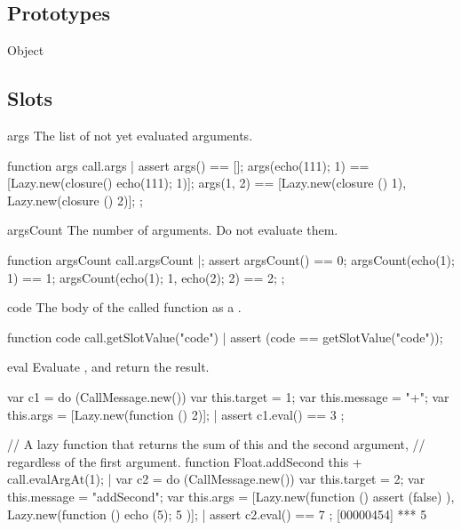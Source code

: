 \subsection{Prototypes}
\begin{refObjects}
\item[Object]
\end{refObjects}

\subsection{Slots}

\begin{urbiscriptapi}
\item[args]%
  The list of not yet evaluated arguments.
\begin{urbiscript}
function args { call.args }|
assert
{
  args() == [];
  args({echo(111); 1}) == [Lazy.new(closure() {echo(111); 1})];
  args(1, 2) == [Lazy.new(closure () {1}),
                 Lazy.new(closure () {2})];
};
\end{urbiscript}


\item[argsCount]
  The number of arguments.  Do not evaluate them.
\begin{urbiscript}
function argsCount { call.argsCount }|;
assert
{
  argsCount() == 0;
  argsCount({echo(1); 1}) == 1;
  argsCount({echo(1); 1}, {echo(2); 2}) == 2;
};
\end{urbiscript}


\item[code]
  The body of the called function as a .
\begin{urbiscript}
function code { call.getSlotValue("code") }|
assert (code == getSlotValue("code"));
\end{urbiscript}


\item[eval] Evaluate \this, and return the result.
\begin{urbiscript}
var c1 = do (CallMessage.new())
{
  var this.target = 1;
  var this.message = "+";
  var this.args = [Lazy.new(function () {2})];
}|
assert { c1.eval() == 3 };

// A lazy function that returns the sum of this and the second argument,
// regardless of the first argument.
function Float.addSecond
{
  this + call.evalArgAt(1);
}|
var c2 = do (CallMessage.new())
{
  var this.target = 2;
  var this.message = "addSecond";
  var this.args = [Lazy.new(function (){ assert (false) }),
                   Lazy.new(function (){ echo (5); 5 })];
}|
assert { c2.eval() == 7 };
[00000454] *** 5
\end{urbiscript}



\end{urbiscriptapi}

